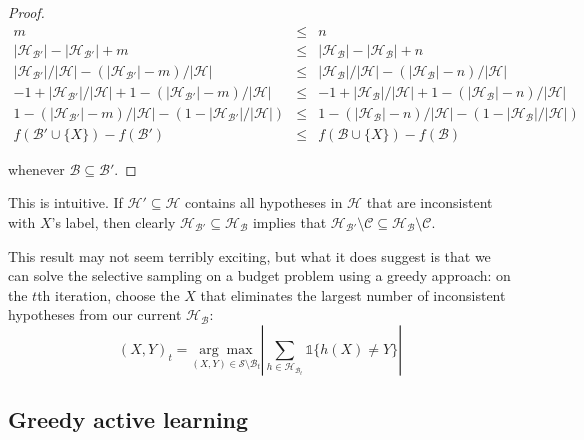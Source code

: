 \begin{proof}
\begin{eqnarray*}
m &\leq& n \\
|\mathcal{H}_{\mathcal{B}'}| - |\mathcal{H}_{\mathcal{B}'}| + m &\leq& |\mathcal{H}_{\mathcal{B}}| - |\mathcal{H}_{\mathcal{B}}| + n \\
|\mathcal{H}_{\mathcal{B}'}|/|\mathcal{H}| - (|\mathcal{H}_{\mathcal{B}'}| - m)/|\mathcal{H}| &\leq& |\mathcal{H}_{\mathcal{B}}|/|\mathcal{H}| - (|\mathcal{H}_{\mathcal{B}}| - n)/|\mathcal{H}| \\
-1 + |\mathcal{H}_{\mathcal{B}'}|/|\mathcal{H}| + 1 - (|\mathcal{H}_{\mathcal{B}'}| - m)/|\mathcal{H}| &\leq& -1 + |\mathcal{H}_{\mathcal{B}}|/|\mathcal{H}| + 1 - (|\mathcal{H}_{\mathcal{B}}| - n)/|\mathcal{H}| \\
1 - (|\mathcal{H}_{\mathcal{B}'}| - m)/|\mathcal{H}| - (1 - |\mathcal{H}_{\mathcal{B}'}|/|\mathcal{H}|) &\leq& 1 - (|\mathcal{H}_{\mathcal{B}}| - n)/|\mathcal{H}| - (1 - |\mathcal{H}_{\mathcal{B}}|/|\mathcal{H}|) \\
f(\mathcal{B}' \cup \{X\}) - f(\mathcal{B}') &\leq& f(\mathcal{B} \cup \{X\}) - f(\mathcal{B})
\end{eqnarray*}

\noindent whenever $\mathcal{B} \subseteq \mathcal{B}'$.
\end{proof}
\noindent This is intuitive. If $\mathcal{H}' \subseteq \mathcal{H}$ contains all hypotheses in $\mathcal{H}$ that are inconsistent with $X$'s label, then clearly $\mathcal{H}_{\mathcal{B}'} \subseteq \mathcal{H}_{\mathcal{B}}$ implies that $\mathcal{H}_{\mathcal{B}'} \setminus \mathcal{C} \subseteq \mathcal{H}_{\mathcal{B}} \setminus \mathcal{C}$.

This result may not seem terribly exciting, but what it does suggest is that we can solve the selective sampling on a budget problem using a greedy approach: on the $t$th iteration, choose the $X$ that eliminates the largest number of inconsistent hypotheses from our current $\mathcal{H}_{\mathcal{B}}$:
\[
(X, Y)_t = \underset{(X,Y) \in \mathcal{S} \setminus \mathcal{B}_t}{\arg\max} \left|\sum_{h \in \mathcal{H}_{\mathcal{B}_t}} \mathds{1}\{h(X) \not= Y\} \right|
\]

\subsection{Greedy active learning}

